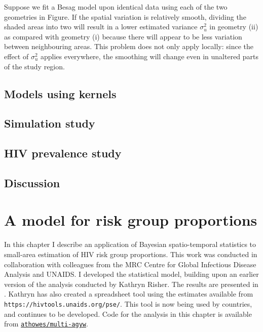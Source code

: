 \documentclass[a4paper, nobind]{templates/ociamthesis}
\begin{document}
Suppose we fit a Besag model upon identical data using each of the two geometries in Figure.
If the spatial variation is relatively smooth, dividing the shaded areas into two will result in a lower estimated variance \(\sigma^2_u\) in geometry (ii) as compared with geometry (i) because there will appear to be less variation between neighbouring areas.
This problem does not only apply locally: since the effect of \(\sigma^2_u\) applies everywhere, the smoothing will change even in unaltered parts of the study region.

\hypertarget{models-using-kernels}{%
\section{Models using kernels}\label{models-using-kernels}}

\hypertarget{simulation-study}{%
\section{Simulation study}\label{simulation-study}}

\hypertarget{hiv-prevalence-study}{%
\section{HIV prevalence study}\label{hiv-prevalence-study}}

\hypertarget{discussion}{%
\section{Discussion}\label{discussion}}

\hypertarget{multi-agyw}{%
\chapter{A model for risk group proportions}\label{multi-agyw}}

\adjustmtc
{}

In this chapter I describe an application of Bayesian spatio-temporal statistics to small-area estimation of HIV risk group proportions.
This work was conducted in collaboration with colleagues from the MRC Centre for Global Infectious Disease Analysis and UNAIDS.
I developed the statistical model, building upon an earlier version of the analysis conducted by Kathryn Risher.
The results are presented in \textcite{howes2023spatio}.
Kathryn has also created a spreadsheet tool using the estimates available from \texttt{https://hivtools.unaids.org/pse/}.
This tool is now being used by countries, and continues to be developed.
Code for the analysis in this chapter is available from \href{https://github.com/athowes/multi-agyw}{\texttt{athowes/multi-agyw}}.
\end{document}
